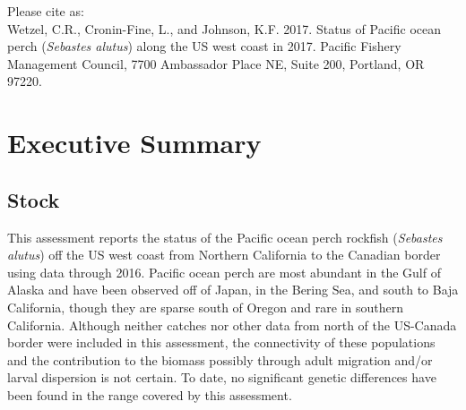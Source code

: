 \documentclass[12pt,]{article}
\begin{document}
\begin{center}
\newpage

\vspace{3cm}

Please cite as:\\

Wetzel, C.R., Cronin-Fine, L., and Johnson, K.F. 2017. Status of Pacific ocean perch (\textit{Sebastes alutus}) along the US west coast in 2017. Pacific Fishery Management Council, 7700 Ambassador Place NE, Suite 200, Portland, OR 97220. 

\vspace{3cm}

\maketitle






\setcounter{page}{1}
\end{center}

{
\setcounter{tocdepth}{4}
\tableofcontents
}
\setlength{\parskip}{5mm plus1mm minus1mm} \pagebreak

\setcounter{page}{1} \renewcommand{\thefigure}{\alph{figure}}
\renewcommand{\thetable}{\alph{table}}

\section*{Executive Summary}\label{executive-summary}

\subsection*{Stock}\label{stock}

This assessment reports the status of the Pacific ocean perch rockfish
(\emph{Sebastes alutus}) off the US west coast from Northern California
to the Canadian border using data through 2016. Pacific ocean perch are
most abundant in the Gulf of Alaska and have been observed off of Japan,
in the Bering Sea, and south to Baja California, though they are sparse
south of Oregon and rare in southern California. Although neither
catches nor other data from north of the US-Canada border were included
in this assessment, the connectivity of these populations and the
contribution to the biomass possibly through adult migration and/or
larval dispersion is not certain. To date, no significant genetic
differences have been found in the range covered by this assessment.
\end{document}
